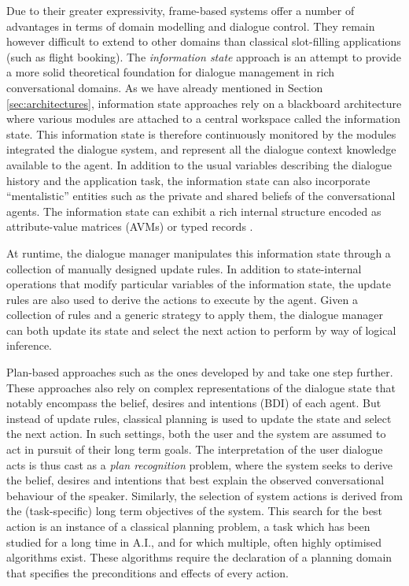 Due to their greater expressivity, frame-based systems offer a number of advantages in terms of domain modelling and dialogue control.  They remain however difficult to extend to other domains than classical slot-filling applications (such as flight booking).  The \textit{information state} approach \citep{Larsson:2000} is an attempt to provide a more solid theoretical foundation for dialogue management in rich conversational domains.  As we have already mentioned in Section \ref{sec:architectures}, information state approaches rely on a blackboard architecture where various modules are attached to a central workspace called the information state. This information state is therefore continuously monitored by the modules integrated the dialogue system, and represent all the dialogue context knowledge available to the agent. In addition to the usual variables describing the dialogue history and the application task, the information state can also incorporate ``mentalistic'' entities such as the private and shared beliefs of the conversational agents.  The information state can exhibit a rich internal structure encoded as attribute-value matrices (AVMs) or typed records  \citep{RobinCooper2012}. 

At runtime, the dialogue manager manipulates this information state through a collection of manually designed update rules. In addition to state-internal operations that modify particular variables of the information state, the update rules are also used to derive the actions to execute by the agent.  Given a collection of rules and a generic strategy to apply them, the dialogue manager can both update its state and select the next action to perform by way of logical inference.

Plan-based approaches such as the ones developed by \cite{Freedman:2000} and \cite{Allen:2001} take one step further. These approaches also rely on complex representations of the dialogue state that notably encompass the belief, desires and intentions (BDI) of each agent.  But instead of update rules, classical planning is used to update the state and select the next action.  In such settings, both the user and the system are assumed to act in pursuit of their long term goals.  The interpretation of the user dialogue acts is thus cast as a \textit{plan recognition} problem, where the system seeks to derive the belief, desires and intentions that best explain the observed conversational behaviour of the speaker.  Similarly, the selection of system actions is derived from the (task-specific) long term objectives of the system. This search for the best action is an instance of a classical planning problem, a task which has been studied for a long time in A.I., and for which multiple, often highly optimised algorithms exist. These algorithms require the declaration of a planning domain that specifies the preconditions and effects of every action. 


